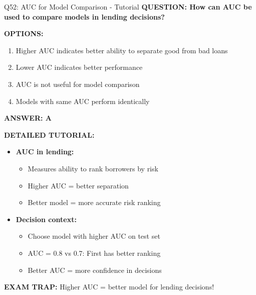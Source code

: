 \documentclass[8pt]{beamer}
\begin{document}
	\begin{frame}{Q52: AUC for Model Comparison - Tutorial}
		\fontsize{6.5}{7.5}\selectfont
		\textbf{QUESTION: How can AUC be used to compare models in lending decisions?}
		
		\vspace{0.1cm}
		\textbf{OPTIONS:}
		\begin{enumerate}
			\item Higher AUC indicates better ability to separate good from bad loans
			\item Lower AUC indicates better performance
			\item AUC is not useful for model comparison
			\item Models with same AUC perform identically
		\end{enumerate}
		
		\vspace{0.1cm}
		\textcolor{myblue}{\textbf{ANSWER: A}}
		
		\vspace{0.1cm}
		\textbf{DETAILED TUTORIAL:}
		\begin{itemize}
			\item \textbf{AUC in lending:}
			\begin{itemize}
				\item Measures ability to rank borrowers by risk
				\item Higher AUC = better separation
				\item Better model = more accurate risk ranking
			\end{itemize}
			\item \textbf{Decision context:}
			\begin{itemize}
				\item Choose model with higher AUC on test set
				\item AUC = 0.8 vs 0.7: First has better ranking
				\item Better AUC = more confidence in decisions
			\end{itemize}
		\end{itemize}
		
		\textcolor{myred}{\textbf{EXAM TRAP:}} Higher AUC = \textcolor{myblue}{better model} for lending decisions!
	\end{frame}
	
\end{document}
